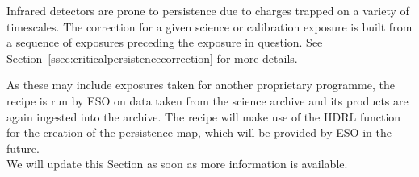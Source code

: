 Infrared detectors are prone to persistence due to charges trapped on a variety of timescales. The correction for a given science or
calibration exposure is built from a sequence of exposures preceding the exposure in question.
See Section~\ref{ssec:criticalpersistencecorrection} for more details.

As these may include exposures taken for another proprietary programme, the recipe is run by ESO on data taken from the science archive and its products are again ingested into the archive. The recipe will make use of the \ac{HDRL} function for the creation of the persistence map, which will be provided by \ac{ESO} in the future.\\
We will update this Section as soon as more information is available.







